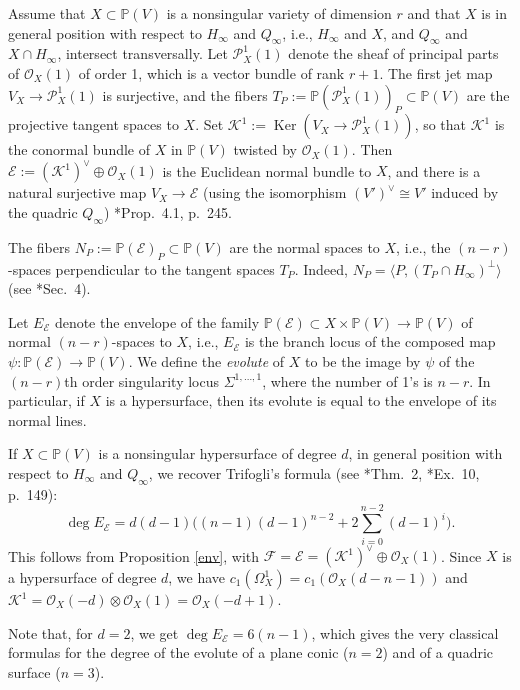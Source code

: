 \documentclass[reqno]{amsart}
\theoremstyle{definition}
\theoremstyle{remark}
\DeclareMathOperator{\Ker}{Ker}
\begin{document}
Assume that $X\subset \mathbb P(V)$ is a nonsingular variety of dimension $r$ and that $X$ is in general position with respect to $H_\infty$ and $Q_\infty$, i.e., $H_\infty$ and $X$,  and $Q_\infty$  and $X\cap H_\infty$, intersect transversally.  Let $\mathcal P^1_X(1)$ denote the sheaf of principal parts of $\mathcal O_X(1)$ of order 1, which is a vector bundle of rank $r+1$. The first jet map $V_X\to \mathcal P^1_X(1)$ is surjective, and the fibers  $T_P:=\mathbb P(\mathcal P^1_X(1))_P\subset  \mathbb P(V)$ are the projective tangent spaces to $X$.
Set $\mathcal K^1:=\Ker (V_X\to \mathcal P^1_X(1))$, so that $\mathcal K^1$ is the conormal bundle of $X$ in $\mathbb P(V)$ twisted by $\mathcal O_X(1)$. Then $\mathcal E:=(\mathcal K^1)^\vee \oplus \mathcal O_X(1)$ is the Euclidean normal bundle to $X$, and there is a natural surjective map $V_X \to \mathcal E$ (using the isomorphism $(V')^\vee \cong V'$ induced by the quadric $Q_\infty$)
\cite{reci}*{Prop.~4.1, p.~245}.  

The fibers $N_P:= \mathbb P(\mathcal E)_P\subset \mathbb P(V)$ are the normal spaces to $X$, i.e., the
$(n-r)$-spaces perpendicular to the tangent spaces $T_P$. Indeed, $N_P=\langle P, (T_P\cap H_\infty)^\perp \rangle$ (see \cite{reci}*{Sec.~4}).

Let $E_\mathcal E$ denote the envelope of the family $ \mathbb P(\mathcal E) \subset X\times \mathbb P(V) \to \mathbb P(V)$ of  normal $(n-r)$-spaces to $X$, i.e., $E_\mathcal E$ is the branch locus of the composed map $\psi\colon \mathbb P(\mathcal E) \to \mathbb P(V)$. We define the \emph{evolute} of $X$ to be the image by $\psi$ of the $(n-r)$th order singularity locus $\Sigma^{1,\dots,1}$, where the number of 1's is $n-r$. In particular, if $X$ is a hypersurface, then its evolute is equal to the envelope of its normal lines.

If $X\subset \mathbb P(V)$ is a nonsingular hypersurface of degree $d$, in general position with respect to $H_\infty$ and $Q_\infty$, we recover Trifogli's formula (see \cite{Trifogli}*{Thm.~2}, \cite{Polar_rev}*{Ex.~10, p.~149}):
\[\textstyle \deg E_\mathcal E=d(d-1)\bigl((n-1)(d-1)^{n-2}+2\sum_{i=0}^{n-2}(d-1)^i\bigr).\]
This follows from Proposition \ref{env}, with $\mathcal F=\mathcal E=(\mathcal K^1)^\vee \oplus \mathcal O_X(1)$. Since $X$ is a hypersurface of degree $d$, we have $c_1(\Omega_X^1)=c_1(\mathcal O_X(d-n-1))$ and $\mathcal K^1=\mathcal O_X(-d)\otimes \mathcal O_X(1)=\mathcal O_X(-d+1)$. 

Note that, for $d=2$, we get $\deg E_\mathcal E=6(n-1)$,
which gives the very classical formulas for the degree of the evolute of a plane conic ($n=2$) and of a quadric surface ($n=3$).
\end{document}
